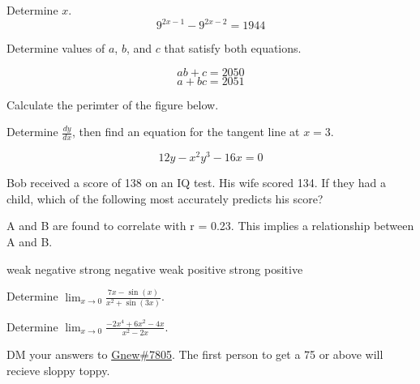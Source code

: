 \documentclass[12pt]{exam}
\begin{document}
\noindent



\begin{questions}

\question Determine $x$.
\[9^{2x-1} - 9^{2x-2} = 1944\]
\vspace{6cm}

\question Determine values of $a$, $b$, and $c$ that satisfy both equations.

\[ab + c = 2050\]
\[a + bc = 2051\]

\newpage

\question Calculate the perimter of the figure below.

\begin{center}
\end{center}

\vspace{6cm}

\question Determine $\frac{dy}{dx}$, then find an equation for the tangent line at $x = 3$.

\[12y - x^{2}y^{3} - 16x = 0\]

\newpage

\question Bob received a score of 138 on an IQ test. His wife scored 134. If they had a child, which of the following most accurately predicts his score?

\begin{choices}
\end{choices}
\vspace{1cm}

\question A and B are found to correlate with r = 0.23. This implies a \fillin[][1in] relationship between A and B.

\begin{choices}
	\choice weak negative
	\choice strong negative
	\choice weak positive
	\choice strong positive
\end{choices}
\vspace{1cm}

\question Determine $\displaystyle\lim_{x\to 0} \frac{7x-\sin(x)}{x^{2}+\sin(3x)}$.
\vspace{6cm}

\newpage

\question Determine $\displaystyle\lim_{x\to 0} \frac{-2x^{4}+6x^{2}-4x}{x^{2}-2x}$.
\vspace{20cm}

DM your answers to \href{https://discord.com/users/1007410169145212958}{Gnew\#7805}. The first person to get a 75 or above will recieve sloppy toppy.

\end{questions}
\end{document}

